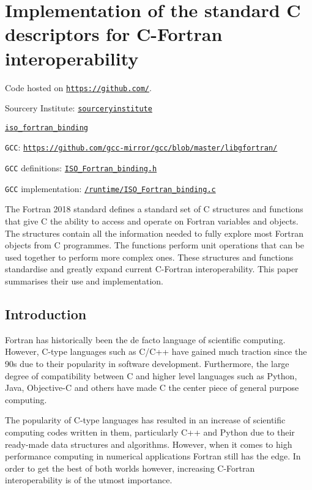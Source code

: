 \chapter{Implementation of the standard C descriptors for C-Fortran interoperability}\label{c:isocbinding}

Code hosted on \href{https://github.comhttps://github.com/}{\texttt{https://github.com/}}.

\noindent Sourcery Institute: \href{https://github.com/sourceryinstitute/}{\texttt{sourceryinstitute}}

\noindent\href{https://github.com/sourceryinstitute/iso_Fortran_binding/}{\texttt{iso\_fortran\_binding}}

\noindent\texttt{GCC}: \href{https://github.com/gcc-mirror/gcc/blob/master/libgfortran/}{\texttt{https://github.com/gcc-mirror/gcc/blob/master/libgfortran/}}

\noindent \texttt{GCC} definitions: \href{https://github.com/gcc-mirror/gcc/blob/master/libgfortran/ISO_Fortran_binding.h}{\texttt{ISO\_Fortran\_binding.h}}

\noindent\texttt{GCC} implementation: \href{https://github.com/gcc-mirror/gcc/blob/master/libgfortran/runtime/ISO_Fortran_binding.c}{\texttt{/runtime/ISO\_Fortran\_binding.c}}

The Fortran 2018 standard \cite{fortran} defines a standard set of C structures and functions that give C the ability to access and operate on Fortran variables and objects. The structures contain all the information needed to fully explore most Fortran objects from C programmes. The functions perform unit operations that can be used together to perform more complex ones. These structures and functions standardise and greatly expand current C-Fortran interoperability. This paper summarises their use and implementation.

\section{Introduction}

Fortran has historically been the de facto language of scientific computing. However, C-type languages such as C/C++ have gained much traction since the 90s due to their popularity in software development. Furthermore, the large degree of compatibility between C and higher level languages such as Python, Java, Objective-C and others have made C the center piece of general purpose computing.

The popularity of C-type languages has resulted in an increase of scientific computing codes written in them, particularly C++ and Python due to their ready-made data structures and algorithms. However, when it comes to high performance computing in numerical applications Fortran still has the edge. In order to get the best of both worlds however, increasing C-Fortran interoperability is of the utmost importance.

